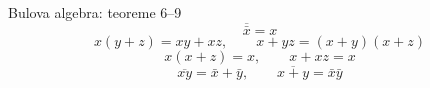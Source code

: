 \begin{frame}[label=01-s024]{Bulova algebra: teoreme 6–9}
\setlength{\abovedisplayskip}{3pt}\setlength{\belowdisplayskip}{3pt}
\[\overline{\bar{x}}=x\]
\[x(y+z)=xy+xz,\qquad x+yz=(x+y)(x+z)\]
\[x(x+z)=x,\qquad x+xz=x\]
\vspace{-2mm}
\[\overline{xy}=\bar{x}+\bar{y},\qquad \overline{x+y}=\bar{x}\bar{y}\]

\end{frame}

